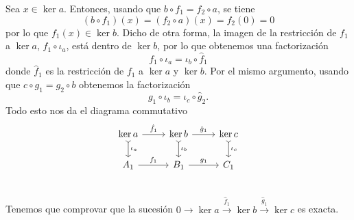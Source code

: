 \documentclass[12pt]{article}
\begin{document}
Sea \( x \in \ker{a} \). Entonces, usando que \( b \circ f_1 = f_2 \circ a \), se tiene
\begin{equation*}
	(b \circ f_1)(x) = (f_2 \circ a)(x) = f_2(0) = 0
\end{equation*}
por lo que \( f_1(x) \in \ker{b} \). Dicho de otra forma, la imagen de la restricción de
\( f_1 \) a \( \ker{a} \), \( f_1 \circ \iota_a \), está dentro de \( \ker{b} \), por lo
que obtenemos una factorización
\begin{equation*}
	f_1 \circ \iota_a = \iota_b \circ \hat{f}_1
\end{equation*}
donde \( \hat{f}_1 \) es la restricción de \( f_1 \) a \( \ker{a} \) y \( \ker{b} \). Por
el mismo argumento, usando que \( c \circ g_1 = g_2 \circ b \) obtenemos la factorización
\begin{equation*}
	g_1 \circ \iota_b = \iota_c \circ \hat{g}_2.
\end{equation*}
Todo esto nos da el diagrama commutativo
\begin{equation}\label{eq:kernels}
	\begin{tikzcd}
		\ker{a} \arrow[d, "\iota_a", tail] \arrow[r, "\hat{f}_1"] & \ker{b} \arrow[d,
		"\iota_b", tail] \arrow[r, "\hat{g}_1"] & \ker{c}
		\arrow[d, "\iota_c", tail] \\
		A_1 \arrow[r, "f_1"] & B_1 \arrow[r, "g_1"]  & C_1 \\
	\end{tikzcd}
\end{equation}
Tenemos que comprovar que la sucesión \( 0 \to \ker{a} \xrightarrow{\hat{f}_1} \ker{b}
\xrightarrow{\hat{g}_1} \ker{c} \) es exacta. 
\end{document}
